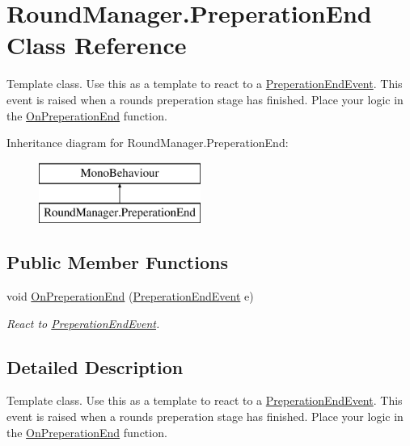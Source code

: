 \hypertarget{class_round_manager_1_1_preperation_end}{}\section{Round\+Manager.\+Preperation\+End Class Reference}
\label{class_round_manager_1_1_preperation_end}


Template class. Use this as a template to react to a \hyperlink{class_round_manager_1_1_events_1_1_preperation_end_event}{Preperation\+End\+Event}. This event is raised when a rounds preperation stage has finished. Place your logic in the \hyperlink{class_round_manager_1_1_preperation_end_a6d57cf26e3d2760d58d9dd94f674634c}{On\+Preperation\+End} function.  


Inheritance diagram for Round\+Manager.\+Preperation\+End\+:\begin{figure}[H]
\begin{center}
\leavevmode
\includegraphics[height=2.000000cm]{class_round_manager_1_1_preperation_end}
\end{center}
\end{figure}
\subsection*{Public Member Functions}
\begin{DoxyCompactItemize}
\item 
void \hyperlink{class_round_manager_1_1_preperation_end_a6d57cf26e3d2760d58d9dd94f674634c}{On\+Preperation\+End} (\hyperlink{class_round_manager_1_1_events_1_1_preperation_end_event}{Preperation\+End\+Event} e)
\begin{DoxyCompactList}\small\item\em React to \hyperlink{class_round_manager_1_1_events_1_1_preperation_end_event}{Preperation\+End\+Event}. \end{DoxyCompactList}\end{DoxyCompactItemize}


\subsection{Detailed Description}
Template class. Use this as a template to react to a \hyperlink{class_round_manager_1_1_events_1_1_preperation_end_event}{Preperation\+End\+Event}. This event is raised when a rounds preperation stage has finished. Place your logic in the \hyperlink{class_round_manager_1_1_preperation_end_a6d57cf26e3d2760d58d9dd94f674634c}{On\+Preperation\+End} function. 



